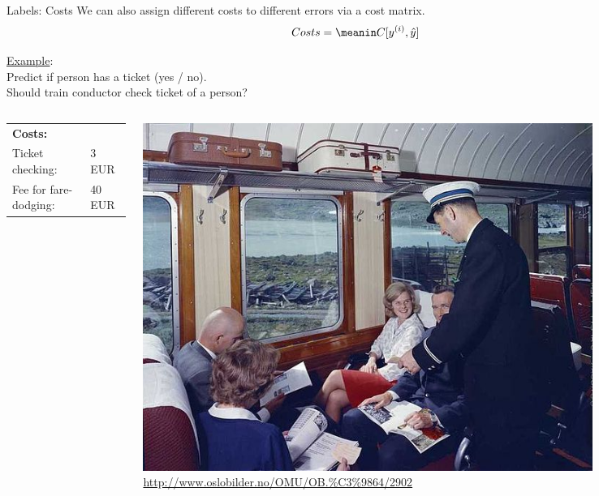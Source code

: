 \documentclass[11pt,compress,t,notes=noshow, xcolor=table]{beamer}
\begin{document}
\begin{vbframe}{Labels: Costs}
We can also assign different costs to different errors via a cost matrix.
\[
  Costs = \meanin C[\yi, \yih]
\]

\underline{Example}:\\ 



Predict if person has a ticket (yes / no).\\ 
Should train conductor check ticket of a person?\\

\begin{columns}
\begin{column}{0.5\textwidth}


  \begin{tabular}{ll}
    \textbf{Costs:} & \\
    Ticket checking:& 3 EUR\\
    Fee for fare-dodging:& 40 EUR\\
  \end{tabular}
  
\end{column}
\begin{column}{0.5\textwidth} 

   \includegraphics[width=0.8\textwidth]{figure_man/conductor.jpg}
    {\tiny \url{http://www.oslobilder.no/OMU/OB.%C3%9864/2902}}
   
\end{column}
\end{columns}

\end{vbframe}
\end{document}
